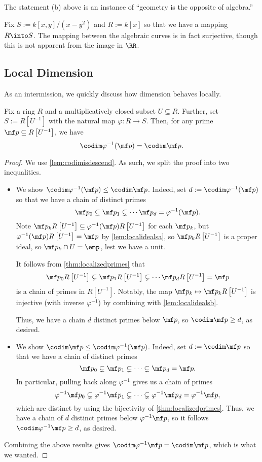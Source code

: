 \begin{remark}[Nir]
	The statement (b) above is an instance of ``geometry is the opposite of algebra.''
\end{remark}
\begin{example}
	Fix $S:=k[x,y]/\left(x-y^2\right)$ and $R:=k[x]$ so that we have a mapping $R\into S$. The mapping between the algebraic curves is in fact surjective, though this is not apparent from the image in $\RR$.
\end{example}

\subsection{Local Dimension}
As an intermission, we quickly discuss how dimension behaves locally.
\begin{lem} \label{lem:localizedim}
	Fix a ring $R$ and a multiplicatively closed subset $U\subseteq R$. Further, set $S:=R\left[U^{-1}\right]$ with the natural map $\varphi:R\to S$. Then, for any prime $\mf p\subseteq R\left[U^{-1}\right]$, we have
	\[\codim\varphi^{-1}(\mf p)=\codim\mf p.\]
\end{lem}
\begin{proof}
	We use \autoref{lem:codimisdescend}. As such, we split the proof into two inequalities.
	\begin{itemize}
		\item We show $\codim\varphi^{-1}(\mf p)\le\codim\mf p$. Indeed, set $d:=\codim\varphi^{-1}(\mf p)$ so that we have a chain of distinct primes
		\[\mf p_0\subsetneq\mf p_1\subsetneq\cdots\mf p_d=\varphi^{-1}(\mf p).\]
		Note $\mf p_kR\left[U^{-1}\right]\subseteq\varphi^{-1}(\mf p)R\left[U^{-1}\right]$ for each $\mf p_k$, but $\varphi^{-1}(\mf p)R\left[U^{-1}\right]=\mf p$ by \autoref{lem:localidealsa}, so $\mf p_kR\left[U^{-1}\right]$ is a proper ideal, so $\mf p_k\cap U=\emp$, lest we have a unit.

		It follows from \autoref{thm:localizedprimes} that
		\[\mf p_0R\left[U^{-1}\right]\subsetneq\mf p_1R\left[U^{-1}\right]\subsetneq\cdots\mf p_dR\left[U^{-1}\right]=\mf p\]
		is a chain of primes in $R\left[U^{-1}\right]$. Notably, the map $\mf p_k\mapsto\mf p_kR\left[U^{-1}\right]$ is injective (with inverse $\varphi^{-1}$) by combining with \autoref{lem:localidealsb}.

		Thus, we have a chain $d$ distinct primes below $\mf p$, so $\codim\mf p\ge d$, as desired.

		\item We show $\codim\mf p\le\codim\varphi^{-1}(\mf p)$. Indeed, set $d:=\codim\mf p$ so that we have a chain of distinct primes
		\[\mf p_0\subsetneq\mf p_1\subsetneq\cdots\subsetneq\mf p_d=\mf p.\]
		In particular, pulling back along $\varphi^{-1}$ gives us a chain of primes
		\[\varphi^{-1}\mf p_0\subsetneq\varphi^{-1}\mf p_1\subsetneq\cdots\subsetneq\varphi^{-1}\mf p_d=\varphi^{-1}\mf p,\]
		which are distinct by using the bijectivity of \autoref{thm:localizedprimes}. Thus, we have a chain of $d$ distinct primes below $\varphi^{-1}\mf p$, so it follows $\codim\varphi^{-1}\mf p\ge d$, as desired.
	\end{itemize}
	Combining the above results gives $\codim\varphi^{-1}\mf p=\codim\mf p$, which is what we wanted.
\end{proof}
